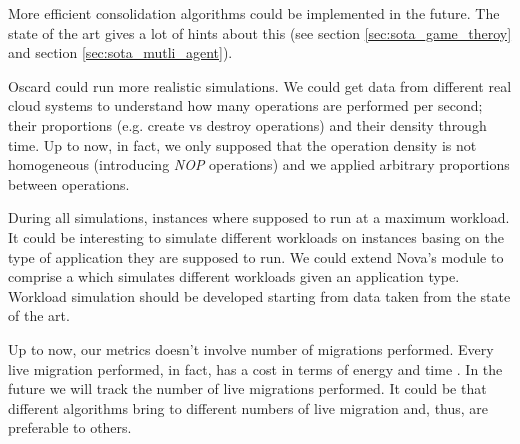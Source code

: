 More efficient consolidation algorithms could be implemented in the future. The state of the art gives a lot of hints about this (see section \ref{sec:sota_game_theroy} and section \ref{sec:sota_mutli_agent}). 

Oscard could run more realistic simulations. We could get data from different real cloud systems to understand how many operations are performed per second; their proportions (e.g. create vs destroy operations) and their density through time. Up to now, in fact, we only supposed that the operation density is not homogeneous (introducing \textit{NOP} operations) and we applied arbitrary proportions between operations.

During all simulations, instances where supposed to run at a maximum workload. It could be interesting to simulate different workloads on instances basing on the type of application they are supposed to run. We could extend Nova's  module to comprise a  which simulates different workloads given an application type. Workload simulation should be developed starting from data taken from the state of the art.

Up to now, our metrics doesn't involve number of migrations performed. Every live migration performed, in fact, has a cost in terms of energy and time . In the future we will track the number of live migrations performed. It could be that different algorithms bring to different numbers of live migration and, thus, are preferable to others.

